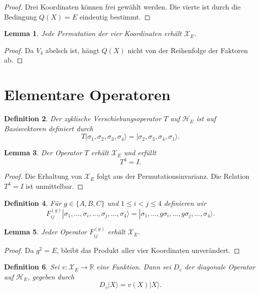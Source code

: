 \documentclass[11pt,a4paper]{article}
\newtheorem{definition}{Definition}[section]
\newtheorem{lemma}[definition]{Lemma}
\theoremstyle{remark}
\newcommand{\V}{V_4}
\newcommand{\XE}{\mathcal X_E}
\newcommand{\HE}{\mathcal H_E}
\begin{document}
	\begin{proof}
		Drei Koordinaten können frei gewählt werden. Die vierte ist durch die Bedingung \(Q(X)=E\) eindeutig bestimmt.
	\end{proof}
	
	\begin{lemma}
		Jede Permutation der vier Koordinaten erhält \(\XE\).
	\end{lemma}
	
	\begin{proof}
		Da \(\V\) abelsch ist, hängt \(Q(X)\) nicht von der Reihenfolge der Faktoren ab.
	\end{proof}
	
	\section{Elementare Operatoren}
	
	\begin{definition}
		Der zyklische Verschiebungsoperator \(T\) auf \(\HE\) ist auf Basisvektoren definiert durch
		\[
		T|\sigma_1,\sigma_2,\sigma_3,\sigma_4\rangle
		=
		|\sigma_2,\sigma_3,\sigma_4,\sigma_1\rangle.
		\]
	\end{definition}
	
	\begin{lemma}
		Der Operator \(T\) erhält \(\XE\) und erfüllt
		\[
		T^4=I.
		\]
	\end{lemma}
	
	\begin{proof}
		Die Erhaltung von \(\XE\) folgt aus der Permutationsinvarianz. Die Relation \(T^4=I\) ist unmittelbar.
	\end{proof}
	
	\begin{definition}
		Für \(g\in\{A,B,C\}\) und \(1\le i<j\le 4\) definieren wir
		\[
		F_{ij}^{(g)}
		|\sigma_1,\dots,\sigma_i,\dots,\sigma_j,\dots,\sigma_4\rangle
		=
		|\sigma_1,\dots,g\sigma_i,\dots,g\sigma_j,\dots,\sigma_4\rangle.
		\]
	\end{definition}
	
	\begin{lemma}
		Jeder Operator \(F_{ij}^{(g)}\) erhält \(\XE\).
	\end{lemma}
	
	\begin{proof}
		Da \(g^2=E\), bleibt das Produkt aller vier Koordinaten unverändert.
	\end{proof}
	
	\begin{definition}
		Sei \(v:\XE\to\mathbb R\) eine Funktion. Dann sei \(D_v\) der diagonale Operator auf \(\HE\), gegeben durch
		\[
		D_v|X\rangle=v(X)|X\rangle.
		\]
	\end{definition}
	
\end{document}
